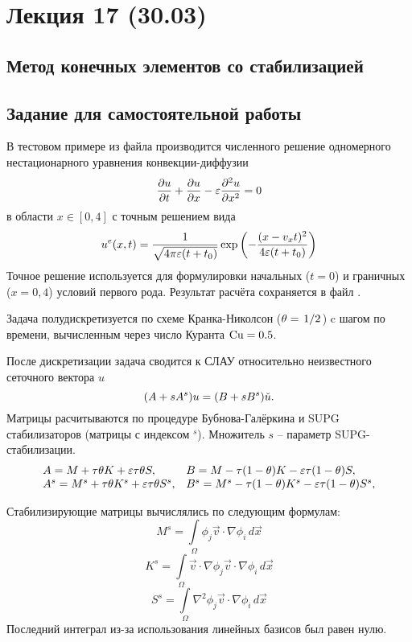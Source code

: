\section{Лекция 17 (30.03)}

\subsection{Метод конечных элементов со стабилизацией}

\subsection{Задание для самостоятельной работы}
В тестовом примере 
из файла 
производится численного решение одномерного нестационарного уравнения конвекции-диффузии
$$
\frac{\partial u}{\partial t} + \frac{\partial u}{\partial x} - \varepsilon \frac{\partial^2 u}{\partial x^2} = 0
$$
в области $x\in[0, 4]$
с точным решением вида
$$
u^e(x, t) = \frac{1}{\sqrt{4\pi \varepsilon (t + t_0)}} \exp\left(-\frac{(x - v_x t)^2}{4\varepsilon(t+t_0)}\right)
$$
Точное решение используется для формулировки начальных ($t=0$) и граничных ($x=0,4$) условий первого рода.
Результат расчёта сохраняется в файл .

Задача полудискретизуется по схеме Кранка-Николсон ($\theta=\left.1\middle/2\right.$) c шагом по времени, вычисленным через число Куранта $\rm Cu = 0.5$.

После дискретизации задача сводится к СЛАУ относительно неизвестного сеточного вектора $u$
$$
(A + s A^s) u = (B + s B^s) \check u. \\
$$
Матрицы расчитываются по процедуре Бубнова-Галёркина и SUPG стабилизаторов (матрицы с индексом $^s$).
Множитель $s$ -- параметр SUPG-стабилизации.
$$
\begin{array}{ll}
A = M + \tau\theta K + \varepsilon\tau\theta S, &
B = M - \tau(1-\theta)K - \varepsilon\tau(1-\theta) S, \\
A^s = M^s + \tau\theta K^s + \varepsilon\tau\theta S^s, &
B^s = M^s - \tau(1-\theta)K^s - \varepsilon\tau (1-\theta) S^s, \\
\end{array}
$$

Стабилизирующие матрицы вычислялись по следующим формулам:
$$
M^s = \int\limits_\Omega \phi_j \vec v \cdot \nabla \phi_i \, d\vec x
$$
$$
K^s = \int\limits_\Omega \vec v \cdot \nabla \phi_j \vec v \cdot \nabla \phi_i \, d\vec x
$$
$$
S^s = \int\limits_\Omega \nabla^2 \phi_j \vec v \cdot \nabla \phi_i \, d\vec x
$$
Последний интеграл из-за использования линейных базисов был равен нулю.

